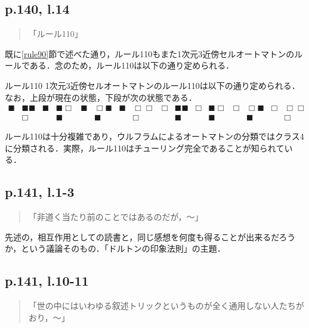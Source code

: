 \documentclass[10pt, a5paper, twoside]{ltjsarticle}
\begin{document}
        \subsection{p.140, l.14}

            \begin{quote}
                「ルール110」
            \end{quote}

            既に\ref{rule90}節で述べた通り，ルール110もまた1次元3近傍セルオートマトンのルールである．念のため，ルール110は以下の通り定められる．

            \begin{dfn}{ルール110}{}
                1次元3近傍セルオートマトンのルール110は以下の通り定められる．なお，上段が現在の状態，下段が次の状態である．
                \begin{align*}
                    \blacksquare &\blacksquare \blacksquare & \blacksquare &\blacksquare \Box & \blacksquare &\Box \blacksquare & \blacksquare &\Box \Box & \Box &\blacksquare \blacksquare & \Box &\blacksquare \Box & \Box &\Box \blacksquare & \Box &\Box \Box\\ &\Box & &\blacksquare & &\blacksquare & &\Box & &\blacksquare & &\blacksquare & &\blacksquare & &\Box
                \end{align*}
            \end{dfn}

            ルール110は十分複雑であり，ウルフラムによるオートマトンの分類ではクラス4に分類される．実際，ルール110はチューリング完全であることが知られている\cite{cook}．

        \subsection{p.141, l.1-3}

            \begin{quote}
                「非道く当たり前のことではあるのだが，〜」
            \end{quote}

            先述の，相互作用としての読書と，同じ感想を何度も得ることが出来るだろうか，という議論そのもの．「ドルトンの印象法則」の主題．

        \subsection{p.141, l.10-11}

            \begin{quote}
                「世の中にはいわゆる叙述トリックというものが全く通用しない人たちがおり，〜」
            \end{quote}
\end{document}
